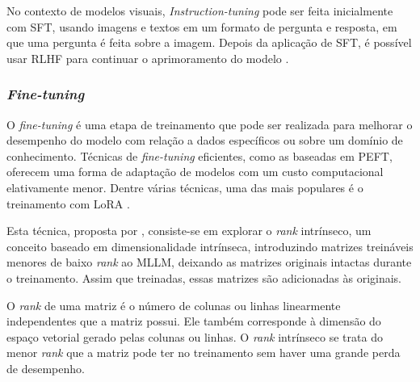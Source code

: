 No contexto de modelos visuais, \textit{Instruction-tuning} pode ser feita inicialmente com \ac{SFT}, usando imagens e
textos em um formato de pergunta e resposta, em que uma pergunta é feita sobre a imagem. Depois da aplicação de
\ac{SFT}, é possível usar \ac{RLHF} para continuar o aprimoramento do modelo \cite{mllm_survey_2024}.

\subsubsection{\textit{Fine-tuning}}

O \textit{fine-tuning} é uma etapa de treinamento que pode ser realizada para melhorar o desempenho do modelo com
relação a dados específicos ou sobre um domínio de conhecimento. Técnicas de \textit{fine-tuning} eficientes, como as
baseadas em \ac{PEFT}, oferecem uma forma de adaptação de modelos com um custo computacional elativamente menor. Dentre
várias técnicas, uma das mais populares é o treinamento com \ac{LoRA} \cite{llm_survey_2023}.


Esta técnica, proposta por \textcite{hu2021lora}, consiste-se em explorar o \textit{rank} intrínseco, um conceito
baseado em dimensionalidade intrínseca, introduzindo matrizes treináveis menores de baixo \textit{rank} ao \ac{MLLM},
deixando as matrizes originais intactas durante o treinamento. Assim que treinadas, essas matrizes são adicionadas às
originais.

O \textit{rank} de uma matriz é o número de colunas ou linhas linearmente independentes que a matriz possui. Ele também
corresponde à dimensão do espaço vetorial gerado pelas colunas ou linhas. O \textit{rank} intrínseco se trata do menor
\textit{rank} que a matriz pode ter no treinamento sem haver uma grande perda de desempenho.

